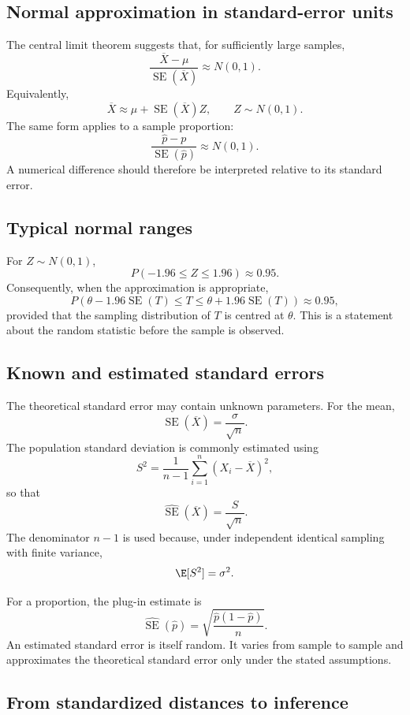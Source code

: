 \subsection*{Normal approximation in standard-error units}

The central limit theorem suggests that, for sufficiently large samples,
\[
\frac{\overline X-\mu}{\operatorname{SE}(\overline X)}
\approx N(0,1).
\]
Equivalently,
\[
\overline X
\approx
\mu+\operatorname{SE}(\overline X)Z,
\qquad Z\sim N(0,1).
\]
The same form applies to a sample proportion:
\[
\frac{\widehat p-p}{\operatorname{SE}(\widehat p)}
\approx N(0,1).
\]
A numerical difference should therefore be interpreted relative to its standard
error.

\subsection*{Typical normal ranges}

For \(Z\sim N(0,1)\),
\[
P(-1.96\leq Z\leq1.96)\approx0.95.
\]
Consequently, when the approximation is appropriate,
\[
P\left(
\theta-1.96\operatorname{SE}(T)
\leq T\leq
\theta+1.96\operatorname{SE}(T)
\right)
\approx0.95,
\]
provided that the sampling distribution of \(T\) is centred at \(\theta\).
This is a statement about the random statistic before the sample is observed.

\subsection*{Known and estimated standard errors}

The theoretical standard error may contain unknown parameters. For the mean,
\[
\operatorname{SE}(\overline X)=\frac{\sigma}{\sqrt n}.
\]
The population standard deviation is commonly estimated using
\[
S^2=\frac1{n-1}\sum_{i=1}^n(X_i-\overline X)^2,
\]
so that
\[
\widehat{\operatorname{SE}}(\overline X)=\frac{S}{\sqrt n}.
\]
The denominator \(n-1\) is used because, under independent identical sampling
with finite variance,
\[
\E[S^2]=\sigma^2.
\]

For a proportion, the plug-in estimate is
\[
\widehat{\operatorname{SE}}(\widehat p)
=
\sqrt{\frac{\widehat p(1-\widehat p)}{n}}.
\]
An estimated standard error is itself random. It varies from sample to sample and
approximates the theoretical standard error only under the stated assumptions.

\subsection*{From standardized distances to inference}

